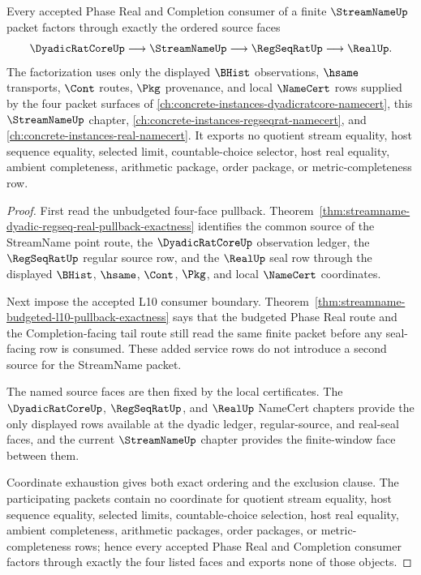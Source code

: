 \begin{theorem}
\label{thm:streamname-l10-four-step-source-lattice}
Every accepted Phase Real and Completion consumer of a finite $\StreamNameUp$ packet factors through exactly the ordered source faces
$$
\DyadicRatCoreUp
\longrightarrow
\StreamNameUp
\longrightarrow
\RegSeqRatUp
\longrightarrow
\RealUp.
$$
The factorization uses only the displayed $\BHist$ observations, $\hsame$ transports, $\Cont$ routes, $\Pkg$ provenance, and local $\NameCert$ rows supplied by the four packet surfaces of \autoref{ch:concrete-instances-dyadicratcore-namecert}, this $\StreamNameUp$ chapter, \autoref{ch:concrete-instances-regseqrat-namecert}, and \autoref{ch:concrete-instances-real-namecert}. It exports no quotient stream equality, host sequence equality, selected limit, countable-choice selector, host real equality, ambient completeness, arithmetic package, order package, or metric-completeness row.
\end{theorem}
\begin{proof}
First read the unbudgeted four-face pullback. Theorem~\ref{thm:streamname-dyadic-regseq-real-pullback-exactness} identifies the common source of the StreamName point route, the $\DyadicRatCoreUp$ observation ledger, the $\RegSeqRatUp$ regular source row, and the $\RealUp$ seal row through the displayed $\BHist$, $\hsame$, $\Cont$, $\Pkg$, and local $\NameCert$ coordinates.

Next impose the accepted L10 consumer boundary. Theorem~\ref{thm:streamname-budgeted-l10-pullback-exactness} says that the budgeted Phase Real route and the Completion-facing tail route still read the same finite packet before any seal-facing row is consumed. These added service rows do not introduce a second source for the StreamName packet.

The named source faces are then fixed by the local certificates. The $\DyadicRatCoreUp$, $\RegSeqRatUp$, and $\RealUp$ NameCert chapters provide the only displayed rows available at the dyadic ledger, regular-source, and real-seal faces, and the current $\StreamNameUp$ chapter provides the finite-window face between them.

Coordinate exhaustion gives both exact ordering and the exclusion clause. The participating packets contain no coordinate for quotient stream equality, host sequence equality, selected limits, countable-choice selection, host real equality, ambient completeness, arithmetic packages, order packages, or metric-completeness rows; hence every accepted Phase Real and Completion consumer factors through exactly the four listed faces and exports none of those objects.
\end{proof}
